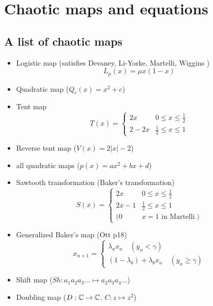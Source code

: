 \documentclass[11pt]{book}
\begin{document}
\chapter{Chaotic maps and equations}
\section{A list of chaotic maps}
\begin{itemize}
  \item Logistic map (satisfies Devaney, Li-Yorke, Martelli, Wiggins \cite{martelli98})
    \begin{equation*}
      L_\mu(x) = \mu x(1-x)
    \end{equation*}
  \item Quadratic map ($Q_c(x) = x^2 + c$)
  \item Tent map 
    \begin{equation*}
      T(x) = 
      \begin{cases}
        2x & 0 \leq x \leq \frac{1}{2}      \\
        2 - 2x & \frac{1}{2} \leq x \leq 1
      \end{cases}
    \end{equation*}
  \item Reverse tent map ($V(x) = 2|x| - 2$)
  \item all quadratic maps ($p(x) = ax^2 + bx + d$)
  \item Sawtooth transformation (Baker's transformation)
    \begin{equation*}
      S(x) = 
      \begin{cases}
        2x     & 0 \leq x \leq \frac{1}{2}      \\
        2x - 1 & \frac{1}{2} \leq x \leq 1      \\
        (0 & x = 1 \mbox{ in Martelli.})
      \end{cases}
    \end{equation*}
  \item Generalized Baker's map (Ott p18)
    \begin{equation*}
      x_{n+1} = 
      \begin{cases}
        \lambda_a x_n \quad   (y_n < \gamma) \\
        (1 - \lambda_b) + \lambda_b x_n \quad   (y_n \geq \gamma)
      \end{cases}
    \end{equation*}
  \item Shift map ($Sh: a_1a_2a_3\ldots \mapsto a_2a_3a_4\ldots$)
  \item Doubling map ($D: \mathbb{C} \to \mathbb{C}$. $C: z \mapsto z^2$)

\end{itemize}
\end{document}
